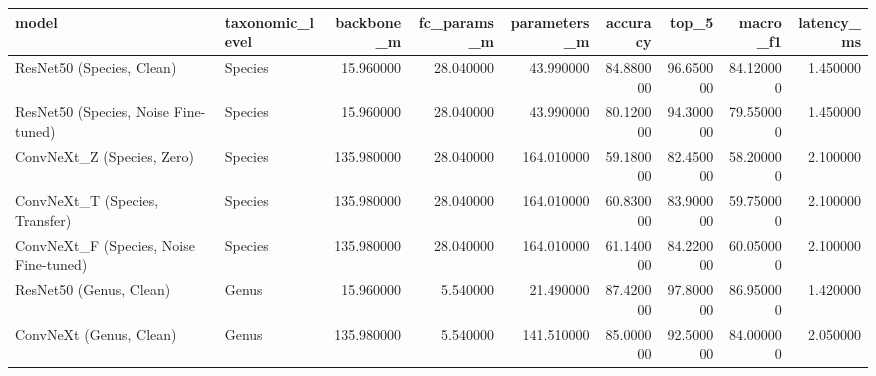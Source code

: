\begin{tabular}{llrrrrrrr}
\toprule
model & taxonomic_level & backbone_m & fc_params_m & parameters_m & accuracy & top_5 & macro_f1 & latency_ms \\
\midrule
ResNet50 (Species, Clean) & Species & 15.960000 & 28.040000 & 43.990000 & 84.880000 & 96.650000 & 84.120000 & 1.450000 \\
ResNet50 (Species, Noise Fine-tuned) & Species & 15.960000 & 28.040000 & 43.990000 & 80.120000 & 94.300000 & 79.550000 & 1.450000 \\
ConvNeXt_Z (Species, Zero) & Species & 135.980000 & 28.040000 & 164.010000 & 59.180000 & 82.450000 & 58.200000 & 2.100000 \\
ConvNeXt_T (Species, Transfer) & Species & 135.980000 & 28.040000 & 164.010000 & 60.830000 & 83.900000 & 59.750000 & 2.100000 \\
ConvNeXt_F (Species, Noise Fine-tuned) & Species & 135.980000 & 28.040000 & 164.010000 & 61.140000 & 84.220000 & 60.050000 & 2.100000 \\
ResNet50 (Genus, Clean) & Genus & 15.960000 & 5.540000 & 21.490000 & 87.420000 & 97.800000 & 86.950000 & 1.420000 \\
ConvNeXt (Genus, Clean) & Genus & 135.980000 & 5.540000 & 141.510000 & 85.000000 & 92.500000 & 84.000000 & 2.050000 \\
\bottomrule
\end{tabular}
